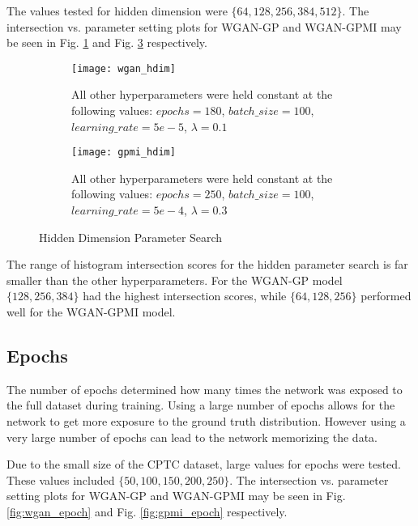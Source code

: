The values tested for hidden dimension were $\{64, 128, 256, 384, 512\}$. The intersection vs. parameter setting plots for WGAN-GP and WGAN-GPMI may be seen in Fig. \ref{fig:wgan_hdim} and Fig. \ref{fig:gpmi_hdim} respectively. 

\begin{figure}[!htbp]
	\centering
	\begin{subfigure}{.7\textwidth}
		\texttt{[image: wgan\_hdim]}		
	\end{subfigure}%
	\begin{subfigure}{.3\textwidth}
		\caption{
			All other hyperparameters were held constant at the following values: $epochs=180$, $batch\_size = 100$, $learning\_rate=5e-5$, $\lambda=0.1$
		}
		\label{fig:wgan_hdim}
	\end{subfigure}%
	
	\begin{subfigure}{.7\textwidth}
		\texttt{[image: gpmi\_hdim]}
	\end{subfigure}%
	\begin{subfigure}{.3\textwidth}
		\caption{
			All other hyperparameters were held constant at the following values: $epochs=250$, $batch\_size=100$, $learning\_rate=5e-4$, $\lambda=0.3$
		}
		\label{fig:gpmi_hdim}
	\end{subfigure}%
	\caption{Hidden Dimension Parameter Search}
\end{figure}


The range of histogram intersection scores for the hidden parameter search is far smaller than the other hyperparameters. For the WGAN-GP model $\{128, 256, 384\}$ had the highest intersection scores, while $\{64,128,256\}$ performed well for the WGAN-GPMI model. 


\subsection{Epochs}
\label{sec:epoch}

The number of epochs determined how many times the network was exposed to the full dataset during training. Using a large number of epochs allows for the network to get more exposure to the ground truth distribution. However using a very large number of epochs can lead to the network memorizing the data. 

Due to the small size of the CPTC dataset, large values for epochs were tested. These values included $\{50, 100, 150, 200, 250\}$. The intersection vs. parameter setting plots for WGAN-GP and WGAN-GPMI may be seen in Fig. \ref{fig:wgan_epoch} and Fig. \ref{fig:gpmi_epoch} respectively. 

